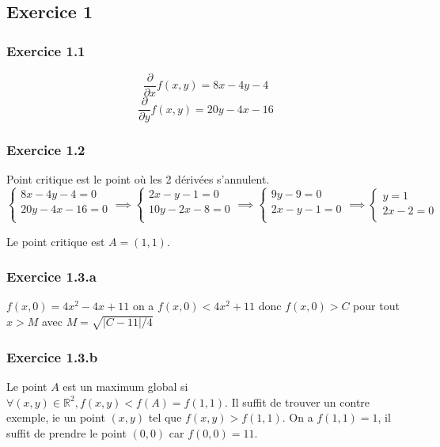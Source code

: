 \documentclass[]{book}
\theoremstyle{definition}
\newcommand{\bb}[1]{\mathbb{#1}}
\newcommand{\R}{\bb{R}}
\begin{document}
\newpage
\subsection*{Exercice 1}
\subsubsection*{Exercice 1.1}
$$
\frac{\partial }{\partial x}f(x,y) = 8x -4y -4
$$
$$
\frac{\partial }{\partial y}f(x,y) = 20y - 4x -16
$$

\subsubsection*{Exercice 1.2}
Point critique est le point o\`u les 2 d\'eriv\'ees s'annulent.
$$
\left\{
\begin{array}{l}
8x - 4y - 4 = 0 \\
20y - 4x - 16 = 0 \\
\end{array}
\right.
\implies
\left\{
\begin{array}{l}
2x - y - 1 = 0 \\
10y -2x - 8 = 0 \\
\end{array}
\right.
\implies
\left\{
\begin{array}{l}
9y - 9 = 0 \\
2x - y - 1 = 0 \\
\end{array}
\right.
\implies
\left\{
\begin{array}{l}
y = 1 \\
2x - 2 = 0 \\
\end{array}
\right.
$$

Le point critique est $A = (1,1)$.

\subsubsection*{Exercice 1.3.a}
$f(x,0) = 4x^2 - 4x + 11$ on a $f(x,0) < 4x^2 +11$
donc $f(x,0) > C$ pour tout $x > M$ avec $M = \sqrt{|C-11|/4}$

\subsubsection*{Exercice 1.3.b}
Le point $A$ est un maximum global si $\forall (x,y) \in \R^2, f(x,y) < f(A) = f(1,1)$. Il suffit de trouver un contre exemple, ie un point $(x,y)$ tel que $ f(x,y) > f(1,1)$. On a $f(1,1) = 1$, il suffit de prendre le point $(0,0)$ car $f(0,0) = 11$. 
\end{document}
